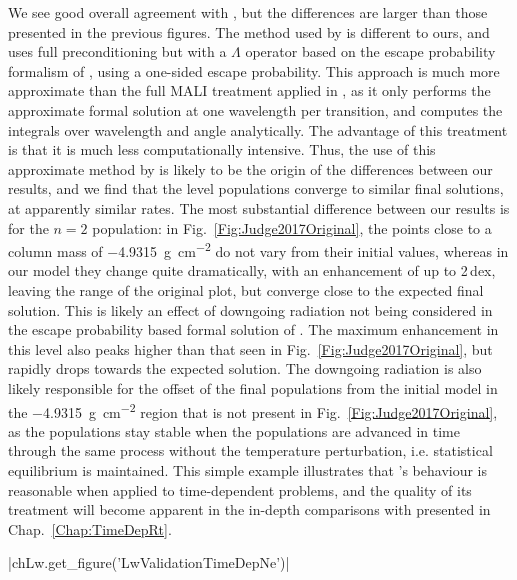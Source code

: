 We see good overall agreement with \citet{Judge2017}, but the differences are larger than those presented in the previous figures.
The method used by \citet{Judge2017} is different to ours, and uses full preconditioning but with a $\Lambda$ operator based on the escape probability formalism of \citet{Hummer1982}, using a one-sided escape probability.
This approach is much more approximate than the full MALI treatment applied in \Lw{}, as it only performs the approximate formal solution at one wavelength per transition, and computes the integrals over wavelength and angle analytically.
The advantage of this treatment is that it is much less computationally intensive.
Thus, the use of this approximate method by \citet{Judge2017} is likely to be the origin of the differences between our results, and we find that the level populations converge to similar final solutions, at apparently similar rates.
The most substantial difference between our results is for the $n=2$ population: in Fig.~\ref{Fig:Judge2017Original}, the points close to a column mass of \SI{-4.9315}{\gram\per\square\centi\metre} do not vary from their initial values, whereas in our model they change quite dramatically, with an enhancement of up to 2\,dex, leaving the range of the original plot, but converge close to the expected final solution.
This is likely an effect of downgoing radiation not being considered in the escape probability based formal solution of \citet{Judge2017}.
The maximum enhancement in this level also peaks higher than that seen in Fig.~\ref{Fig:Judge2017Original}, but rapidly drops towards the expected solution.
The downgoing radiation is also likely responsible for the offset of the final populations from the initial model in the \SI{-4.9315}{\gram\per\square\centi\m} region that is not present in Fig.~\ref{Fig:Judge2017Original}, as the populations stay stable when the populations are advanced in time through the same process without the temperature perturbation, i.e. statistical equilibrium is maintained.
This simple example illustrates that \Lw{}'s behaviour is reasonable when applied to time-dependent problems, and the quality of its treatment will become apparent in the in-depth comparisons with \Radyn{} presented in Chap.~\ref{Chap:TimeDepRt}.

\py[Lw]|chLw.get_figure('LwValidationTimeDepNe')|

